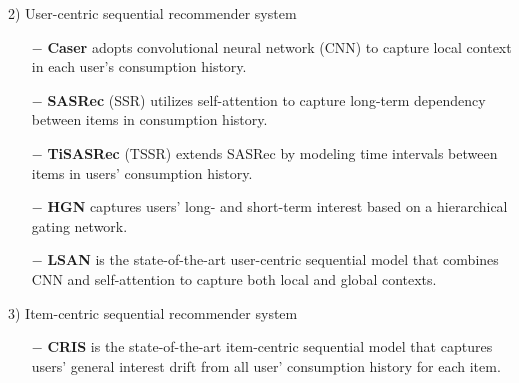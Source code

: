 \documentclass[sigconf]{acmart}
\begin{document}
2) User-centric sequential recommender system
\begin{itemize}
    \item[$-$] \textbf{Caser} \cite{tang2018personalized} adopts convolutional neural network (CNN) to capture local context in each user's consumption history.
    \item[$-$] \textbf{SASRec} (SSR) \cite{kang2018self} utilizes self-attention to capture long-term dependency between items in consumption history. 
    \item[$-$] \textbf{TiSASRec} (TSSR) \cite{li2020time} extends SASRec by modeling time intervals between items in users' consumption history.
    \item[$-$] \textbf{HGN} \cite{ma2019hierarchical} captures users' long- and short-term interest based on a hierarchical gating network.
    \item[$-$] \textbf{LSAN} \cite{li2021lightweight} is the state-of-the-art user-centric sequential model that combines CNN and self-attention to capture both local and global contexts.
\end{itemize}

3) Item-centric sequential recommender system
\begin{itemize}
    \item[$-$] \textbf{CRIS} \cite{hyun2020interest} is the state-of-the-art item-centric sequential model that captures users' general interest drift from all user' consumption history for each item.
\end{itemize}
\end{document}
